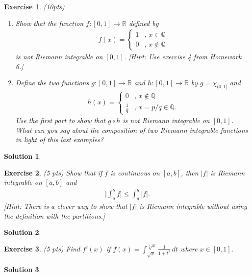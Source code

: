 \documentclass[12pt]{article}
\newcommand{\bR}{\mathbb{R}}
\newcommand{\bQ}{\mathbb{Q}}
\newcommand{\ra}{\rightarrow}
\theoremstyle{plain}
\newtheorem{exer}{\textbf{Exercise}}}
\theoremstyle{plain}
\newtheorem*{sol}{\textbf{Solution}}}
\begin{document}
\begin{exer}
(10pts)
\begin{enumerate}[label=\textbf{\alph*)}]
\item Show that the function $f : [0, 1] \ra \bR$ defined by	
	\begin{align*}
	f(x) = \begin{cases}
	1 &\text{, } x \in \bQ \\
	0 &\text{, } x \not\in \bQ
	\end{cases}
	\end{align*}
is not Riemann integrable on $[0, 1]$. [Hint: Use exercise 4 from Homework 6.]
\item Define the two functions $g : [0, 1] \ra \bR$ and $h : [0, 1] \ra \bR$ by $g = \chi_{(0, 1]}$ and
	\begin{align*}
	h (x) = \begin{cases}
	0 & \text{, } x \not\in \bQ \\
	\frac{1}{q} & \text{, } x = p/q \in \bQ .
	\end{cases}
	\end{align*}
Use the first part to show that $g \circ h$ is not Riemann integrable on $[0, 1]$. What can you say about the composition of two Riemann integrable functions in light of this last examples?
\end{enumerate}
\end{exer}
\begin{sol}

\end{sol}

\begin{exer}
(5 pts)
Show that if $f$ is continuous on $[a, b]$, then $|f|$ is Riemann integrable on $[a, b]$ and
	\begin{align*}
	\Big| \int_a^b f \Big| \leq \int_a^b |f| .
	\end{align*}
[Hint: There is a clever way to show that $|f|$ is Riemann integrable without using the definition with the partitions.]
\end{exer}
\begin{sol}

\end{sol}

\begin{exer}
(5 pts)
Find $f'(x)$ if $f (x) = \displaystyle\int_{\sqrt{x}}^{\sqrt[3]{x}} \frac{1}{1 + t^3} \, dt$ where $x \in [0, 1]$.
\end{exer}
\begin{sol}

\end{sol}
\end{document}
